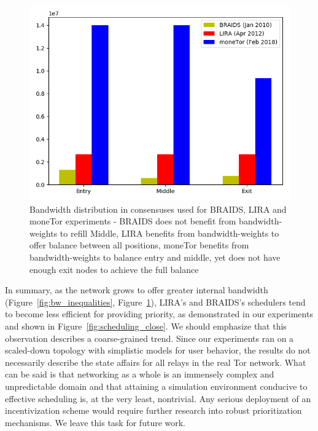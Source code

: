 \begin{figure}
	\centering \includegraphics[scale=0.415]{images/bw_analysis_comp.png}
  \caption{Bandwidth distribution in consensuses used for BRAIDS, LIRA and moneTor experiments - BRAIDS does not benefit from bandwidth-weights to refill Middle, LIRA benefits from bandwidth-weights to offer balance between all positions, moneTor benefits from bandwidth-weights to balance entry and middle, yet does not have enough exit nodes to achieve the full balance}
  \label{fig:bw_comp}
\end{figure}
 
In summary, as the network grows to offer greater internal bandwidth (Figure~\ref{fig:bw_inequalities}, Figure~\ref{fig:bw_comp}), LIRA's and BRAIDS's schedulers tend to become less efficient for providing priority, as demonstrated in our experiments and shown in Figure~\ref{fig:scheduling_close}.
We should emphasize that this observation describes a coarse-grained trend.
Since our experiments ran on a scaled-down topology with simplistic models for user behavior, the results do not necessarily describe the state affairs for all relays in the real Tor network.
What can be said is that networking as a whole is an immensely complex and unpredictable domain and that attaining a simulation environment conducive to effective scheduling is, at the very least, nontrivial.
Any serious deployment of an incentivization scheme would require further research into robust prioritization mechanisms.
We leave this task for future work.

